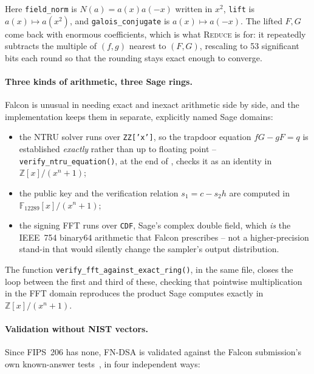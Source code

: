 Here \texttt{field\_norm} is $N(a) = a(x)a(-x)$ written in $x^2$,
\texttt{lift} is $a(x)\mapsto a(x^2)$, and \texttt{galois\_conjugate} is
$a(x)\mapsto a(-x)$. The lifted $F,G$ come back with enormous coefficients,
which is what \textsc{Reduce} is for: it repeatedly subtracts the multiple of
$(f,g)$ nearest to $(F,G)$, rescaling to 53 significant bits each round so
that the rounding stays exact enough to converge.

\paragraph{Three kinds of arithmetic, three Sage rings.}
Falcon is unusual in needing exact and inexact arithmetic side by side, and
the implementation keeps them in separate, explicitly named Sage domains:

\begin{itemize}
  \item the NTRU solver runs over \texttt{ZZ['x']}, so the trapdoor equation
        $fG-gF=q$ is established \emph{exactly} rather than up to floating
        point -- \texttt{verify\_ntru\_equation()}, at the end of
        , checks it as an identity
        in $\mathbb{Z}[x]/(x^n+1)$;
  \item the public key and the verification relation
        $s_1 = c - s_2 h$ are computed in
        $\mathbb{F}_{12289}[x]/(x^n+1)$;
  \item the signing FFT runs over \texttt{CDF}, Sage's complex double field,
        which \emph{is} the IEEE~754 binary64 arithmetic that Falcon
        prescribes -- not a higher-precision stand-in that would silently
        change the sampler's output distribution.
\end{itemize}

The function \texttt{verify\_fft\_against\_exact\_ring()}, in the same file,
closes the loop
between the first and third of these, checking that pointwise multiplication
in the FFT domain reproduces the product Sage computes exactly in
$\mathbb{Z}[x]/(x^n+1)$.

\paragraph{Validation without NIST vectors.}
Since FIPS~206 has none, FN-DSA is validated against the Falcon
submission's own known-answer tests~\cite{falcon2020}, in four independent
ways:

